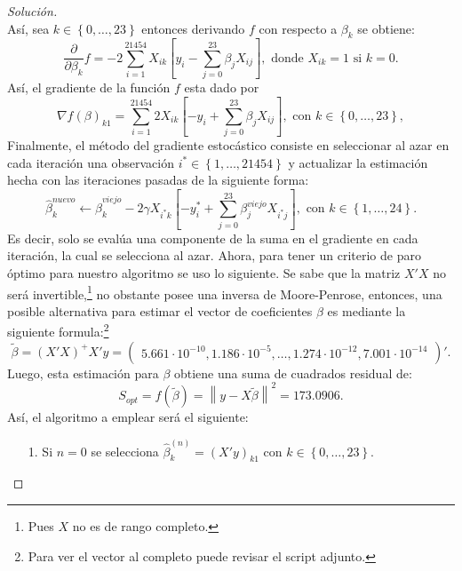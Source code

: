 \documentclass[10.5pt,notitlepage]{article}
\newenvironment{solucion}
  {\begin{proof}[Solución]}
  {\end{proof}}
\newcommand{\norm}[1]{\left\| #1 \right\|}
\newcommand{\corch}[1]{\left[ #1 \right]}
\newcommand{\kis}[1]{\left\{ #1 \right\}}
\theoremstyle{plain}
\begin{document}
\begin{solucion}
\begin{equation*}
\end{equation*}
Así, sea \(k \in \kis{0,\hdots, 23}\) entonces derivando \(f\) con respecto a \(\beta_k\) se obtiene:
\begin{equation*}
    \frac{\partial}{\partial \beta_{k}}f = -2\sum_{i = 1}^{21454}X_{ik}\corch{y_i - \sum_{j = 0}^{23}\beta_jX_{ij}}, \text{ donde } X_{ik} = 1 \text{ si } k = 0.
\end{equation*}
Así, el gradiente de la función \(f\) esta dado por  
\begin{equation*}
    \nabla f(\beta)_{k1} = \sum_{i = 1}^{21454}2X_{ik}\corch{-y_i + \sum_{j = 0}^{23}\beta_jX_{ij}}, \text{ con } k \in \kis{0, \hdots, 23},
\end{equation*}
Finalmente, el método del gradiente estocástico consiste en seleccionar al azar en cada iteración una observación \(i^* \in \kis{1, \hdots, 21454}\) y actualizar la estimación hecha con las iteraciones pasadas de la siguiente forma:
\[
\hat{\beta}_{k}^{nuevo} \leftarrow \hat{\beta}_{k}^{viejo} - 2\gamma X_{i^*k}\corch{-y_i^* +\sum_{j = 0}^{23}\beta_{j}^{viejo}X_{i^*j}}, \text{ con } k \in \kis{1, \hdots,24}.
\]
Es decir, solo se evalúa una componente de la suma en el gradiente en cada iteración, la cual se selecciona al azar. Ahora, para tener un criterio de paro óptimo para nuestro algoritmo se uso lo siguiente. Se sabe que la matriz \(X'X\) no será invertible,\footnote{Pues \(X\) no es de rango completo.} no obstante posee una inversa de Moore-Penrose, entonces, una posible alternativa para estimar el vector de coeficientes \(\beta\) es mediante la siguiente formula:\footnote{Para ver el vector al completo puede revisar el script adjunto.}
\begin{equation}\label{MP}
    \widetilde{\beta} = (X'X)^{+}X'y = \begin{pmatrix}5.661\cdot10^{-10} , 1.186\cdot10^{-5}, \hdots, 1.274\cdot 10^{-12},7.001\cdot10^{-14}\end{pmatrix}'.
\end{equation}
Luego, esta estimación para \(\beta\) obtiene una suma de cuadrados residual de:
\begin{equation}\label{MPSS}
S_{opt} = f(\widetilde{\beta}) =  \norm{y - X \widetilde{\beta}}^2 =  173.0906.    
\end{equation}
Así, el algoritmo a emplear será el siguiente: 
\begin{itemize}
    \item[1.] Si \(n =0\) se selecciona \(\hat{\beta}_{k}^{(n)} = (X'y)_{k1}\) con \(k \in \kis{0, \hdots, 23}\).

\end{itemize}
\end{solucion}
\end{document}

